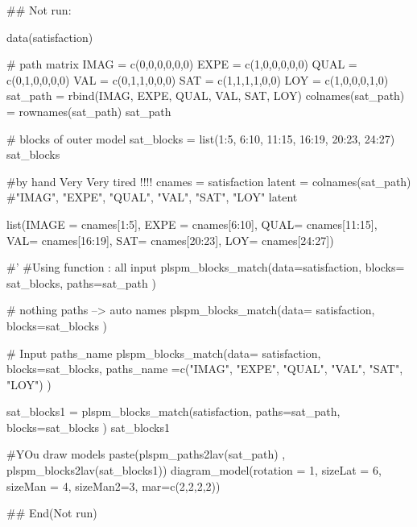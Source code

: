 \documentclass[a4paper]{book}
\begin{document}
\begin{Examples}
\begin{ExampleCode}

\#\# Not run: 

data(satisfaction)


# path matrix
IMAG = c(0,0,0,0,0,0)
EXPE = c(1,0,0,0,0,0)
QUAL = c(0,1,0,0,0,0)
VAL = c(0,1,1,0,0,0)
SAT = c(1,1,1,1,0,0)
LOY = c(1,0,0,0,1,0)
sat_path = rbind(IMAG, EXPE, QUAL, VAL, SAT, LOY)
colnames(sat_path) = rownames(sat_path)
sat_path

# blocks of outer model
sat_blocks = list(1:5, 6:10, 11:15, 16:19, 20:23, 24:27)
sat_blocks


#by hand Very Very tired !!!!
cnames = satisfaction%
latent = colnames(sat_path) #"IMAG", "EXPE", "QUAL", "VAL",  "SAT",  "LOY"
latent

list(IMAGE = cnames[1:5],
     EXPE = cnames[6:10],
     QUAL= cnames[11:15],
     VAL= cnames[16:19],
     SAT= cnames[20:23],
     LOY= cnames[24:27])

#' #Using function : all input
plspm_blocks_match(data=satisfaction, blocks= sat_blocks, paths=sat_path )

# nothing paths --> auto names
plspm_blocks_match(data= satisfaction, blocks=sat_blocks )

# Input paths_name
plspm_blocks_match(data= satisfaction, blocks=sat_blocks,
                   paths_name =c("IMAG", "EXPE", "QUAL", "VAL",  "SAT",  "LOY") )


sat_blocks1 = plspm_blocks_match(satisfaction, paths=sat_path, blocks=sat_blocks )
sat_blocks1

#YOu draw models
paste(plspm_paths2lav(sat_path) ,
      plspm_blocks2lav(sat_blocks1))%
  diagram_model(rotation = 1, sizeLat = 6, sizeMan = 4, sizeMan2=3,
                mar=c(2,2,2,2))

## End(Not run)

\end{ExampleCode}
\end{Examples}
\end{document}

